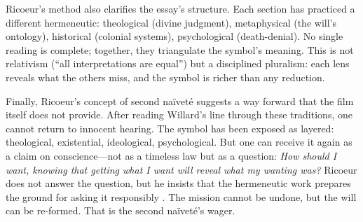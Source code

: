 Ricoeur's method also clarifies the essay's structure. Each section has practiced a different 
hermeneutic: theological (divine judgment), metaphysical (the will's ontology), historical 
(colonial systems), psychological (death-denial). No single reading is complete; together, 
they triangulate the symbol's meaning. This is not relativism (``all interpretations are 
equal'') but a disciplined pluralism: each lens reveals what the others miss, and the symbol 
is richer than any reduction.

Finally, Ricoeur's concept of second naïveté suggests a way forward that the film itself does 
not provide. After reading Willard's line through these traditions, one cannot return to 
innocent hearing. The symbol has been exposed as layered: theological, existential, 
ideological, psychological. But one can receive it again as a claim on conscience---not as a 
timeless law but as a question: \emph{How should I want, knowing that getting what I want will 
reveal what my wanting was?} Ricoeur does not answer the question, but he insists that the 
hermeneutic work prepares the ground for asking it responsibly \parencite{RicoeurSymbol1970}. 
The mission cannot be undone, but the will can be re-formed. That is the second naïveté's 
wager.

